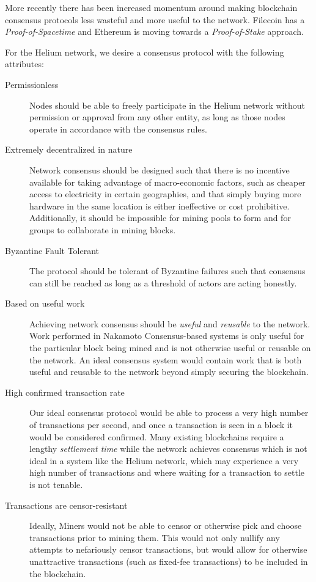 \documentclass[10pt, nonatbib, nocopyrightspace, reprint]{sigplanconf}
\begin{document}
More recently there has been increased momentum around making blockchain consensus protocols less wasteful and more useful to the network. Filecoin \cite{filecoin} has a \emph{Proof-of-Spacetime} and Ethereum \cite{ethereum} is moving towards a \emph{Proof-of-Stake} \cite{pos} approach.

For the Helium network, we desire a consensus protocol with the following attributes:

\begin{description}
\item [Permissionless] Nodes should be able to freely participate in the Helium network without permission or approval from any other entity, as long as those nodes operate in accordance with the consensus rules.

\item [Extremely decentralized in nature] Network consensus should be designed such that there is no incentive available for taking advantage of macro-economic factors, such as cheaper access to electricity in certain geographies, and that simply buying more hardware in the same location is either ineffective or cost prohibitive. Additionally, it should be impossible for mining pools to form and for groups to collaborate in mining blocks.

\item [Byzantine Fault Tolerant] The protocol should be tolerant of Byzantine failures \cite{byzantine-failures} such that consensus can still be reached as long as a threshold of actors are acting honestly.

\item [Based on useful work] Achieving network consensus should be \emph{useful} and \emph{reusable} to the network. Work performed in Nakamoto Consensus-based systems is only useful for the particular block being mined and is not otherwise useful or reusable on the network. An ideal consensus system would contain work that is both useful and reusable to the network beyond simply securing the blockchain.

\item [High confirmed transaction rate] Our ideal consensus protocol would be able to process a very high number of transactions per second, and once a transaction is seen in a block it would be considered confirmed. Many existing blockchains require a lengthy \emph{settlement time} while the network achieves consensus which is not ideal in a system like the Helium network, which may experience a very high number of transactions and where waiting for a transaction to settle is not tenable.

\item [Transactions are censor-resistant] Ideally, Miners would not be able to censor or otherwise pick and choose transactions prior to mining them. This would not only nullify any attempts to nefariously censor transactions, but would allow for otherwise unattractive transactions (such as fixed-fee transactions) to be included in the blockchain.

\end{description}
\end{document}
